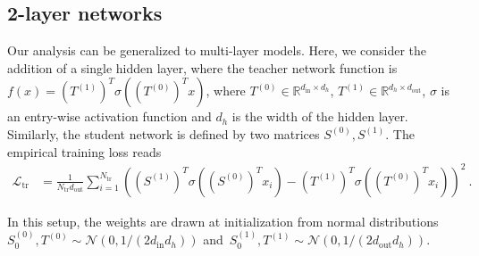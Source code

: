 \documentclass[a4paper,11pt]{article}
\newcommand{\alonb}[1]{}
\newcommand{\dout}{d_\mathrm{out}}
\newcommand{\din}{d_\mathrm{in}}
\newcommand{\training}{\mathrm{tr}}
\begin{document}
\subsection{2-layer networks}
\label{sec:2layer}

Our analysis can be generalized to multi-layer models. Here, we consider the addition of a single hidden layer, where the teacher network function is\alonb{TODO: Check all of the $din \times dout$ and etc.} $f(x)= (T^{(1)})^T\sigma(( T^{(0)}) ^T  x)$, where $T^{(0)} \in \mathbb{R}^{\din \times d_h}$, $T^{(1)} \in \mathbb{R}^{ d_h\times \dout}$, $\sigma$ is an entry-wise activation function and $d_h$ is the width of the hidden layer. Similarly, the student network is defined by two matrices $S^{(0)}, S^{(1)}$. The empirical training loss reads
\begin{align}
\label{eq:2_layer_loss}
    \mathcal{L}_\training 
    &= 
    \frac{1}{N_\training \dout}
    \sum_{i=1}^{N_\training }
    \left( 
    (S^{(1)})^T\sigma((S^{(0)})^T  x_i)
    - (T^{(1)})^T \sigma ((T^{(0)})^T x_i)
    \right)^2\ .
\end{align}

In this setup, the weights are drawn at initialization from normal distributions~$S^{(0)}_0, T^{(0)} \sim \mathcal{N}(0,1/({2 \din }d_{h}))$ and~$S_0^{(1)}, T^{(1)} \sim \mathcal{N}(0,1/({2 \dout }d_{h}))$. 
\end{document}
